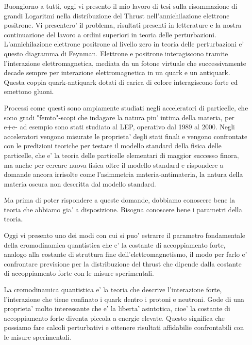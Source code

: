 \documentclass{article}
\begin{document}
    Buongiorno a tutti, oggi vi presento il mio lavoro di tesi sulla risommazione di grandi Logaritmi nella distribuzione
    del Thrust nell'annichilazione elettrone positrone. Vi presentero' il problema, risultati presenti in letterature e la 
    nostra continuazione del lavoro a ordini superiori in teoria delle perturbazioni.
    L'annichilazione elettrone positrone al livello zero in teoria delle perturbazioni e' questo diagramma di Feynman.
    Elettrone e positrone interagiscono tramite l'interazione elettromagnetica, mediata da un fotone virtuale che 
    successivamente decade sempre per interazione elettromagnetica in un quark e un antiquark. Questa coppia
    quark-antiquark dotati di carica di colore interagiscono forte ed emettono gluoni.
    
    Processi come questi sono ampiamente studiati negli acceleratori di particelle, che sono gradi "femto"-scopi che 
    indagare la natura piu' intima della materia, per e+e- 
    ad esempio sono stati studiato al LEP, operativo dal 1989 al 2000. Negli acceleratori vengono 
    misurate le proprieta' degli stati finali e vengono confrontate con le predizioni teoriche per
    testare il modello standard della fisica delle particelle, che e' la teoria delle particelle elementari di maggior successo 
    finora, ma anche per cercare nuova fisica oltre il modello standard e rispondere a domande
    ancora irrisolte come l'asimmetria materia-antimateria, la natura della materia oscura non 
    descritta dal modello standard.
    
    Ma prima di poter rispondere a queste domande, dobbiamo conoscere bene la teoria che abbiamo
    gia' a disposizione. Bisogna conoscere bene i parametri della teoria.
    
    Oggi vi presento uno dei modi con cui si puo' estrarre il parametro fondamentale della cromodinamica quantistica
    che e' la costante di accoppiamento forte, analogo alla costante di struttura fine dell'elettromagnetismo,
    il modo per farlo e' confrontare previsione per la distribuzione del thrust che dipende 
    dalla costante di accoppiamento forte con le misure sperimentali.
    
    La cromodinamica quantistica e' la teoria che descrive l'interazione forte, l'interazione che tiene confinato i quark dentro i protoni e neutroni.
    Gode di una proprieta' molto interessante che e' la liberta' asintotica, cioe' la costante di accoppiamento forte diventa piccola a energie elevate.
    Questo significa che possiamo fare calcoli perturbativi e ottenere risultati affidabilie confrontabili con le misure sperimentali.
\end{document}
